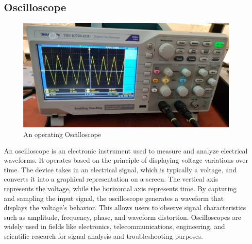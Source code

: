 \documentclass{report}
\begin{document}
\subsection{Oscilloscope}
\begin{figure}[H]
  \centering
  \includegraphics[scale=0.15]{src/oscilloscope.jpeg}
  \caption{An operating Oscilloscope}
\end{figure}
An oscilloscope is an electronic instrument used to measure and analyze electrical waveforms. It operates based on the principle of displaying voltage variations over time. The device takes in an electrical signal, which is typically a voltage, and converts it into a graphical representation on a screen. The vertical axis represents the voltage, while the horizontal axis represents time. By capturing and sampling the input signal, the oscilloscope generates a waveform that displays the voltage's behavior. This allows users to observe signal characteristics such as amplitude, frequency, phase, and waveform distortion. Oscilloscopes are widely used in fields like electronics, telecommunications, engineering, and scientific research for signal analysis and troubleshooting purposes.
\end{document}
